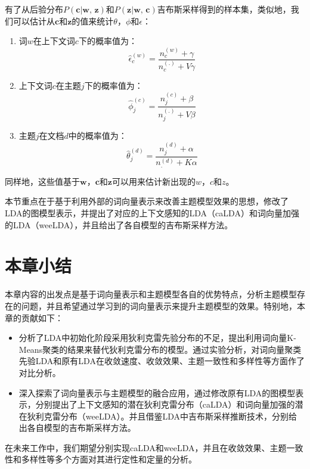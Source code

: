 \documentclass[master]{njuthesis}
\begin{document}
有了从后验分布$P(\textbf{c}|\textbf{w, z})$和$P(\textbf{z}|\textbf{w, c})$吉布斯采样得到的样本集，类似地，我们可以估计从$\textbf{c}$和$\textbf{z}$的值来统计$\theta$，$\phi$和$\epsilon$：
	\begin{enumerate}
	\item 词$w$在上下文词$c$下的概率值为：
		\begin{equation}
		\hat{\epsilon}_{c}^{(w)}=\frac{n_c^{(w)}+\gamma}{n_c^{(.)}+V\gamma}
		\end{equation}
	\item 上下文词$c$在主题$j$下的概率值为：
		\begin{equation}
		\hat{\phi}_{j}^{(c)}=\frac{n_j^{(c)}+\beta}{n_j^{(.)}+V\beta}
		\end{equation}
	\item 主题$j$在文档$d$中的概率值为：
		\begin{equation}
		\hat{\theta}_{j}^{(d)}=\frac{n_{j}^{(d)}+\alpha}{n_{.}^{(d)}+K\alpha}
		\end{equation}	
	\end{enumerate}
	同样地，这些值基于$\textbf{w}$，$\textbf{c}$和$\textbf{z}$可以用来估计新出现的$w$，$c$和$z$。
	
本节重点在于基于利用外部的词向量表示来改善主题模型效果的思想，修改了LDA的图模型表示，并提出了对应的上下文感知的LDA（caLDA）和词向量加强的LDA（weeLDA），并且给出了各自模型的吉布斯采样方法。


\section{本章小结}\label{sec_conclusions_chap5}

本章内容的出发点是基于词向量表示和主题模型各自的优势特点，分析主题模型存在的问题，并且希望通过学习到的词向量表示来提升主题模型的效果。特别地，本章的贡献如下：

\begin{itemize}
\item 分析了LDA中初始化阶段采用狄利克雷先验分布的不足，提出利用词向量K-Means聚类的结果来替代狄利克雷分布的模型。通过实验分析，对词向量聚类先验LDA和原有LDA在收敛速度、收敛效果、主题一致性和多样性等方面作了对比分析。
\item 深入探索了词向量表示与主题模型的融合应用，通过修改原有LDA的图模型表示，分别提出了上下文感知的潜在狄利克雷分布（caLDA）和词向量加强的潜在狄利克雷分布（weeLDA）。并且借鉴LDA中吉布斯采样推断技术，分别给出各自模型的吉布斯采样方法。
\end{itemize}

在未来工作中，我们期望分别实现caLDA和weeLDA，并且在收敛效果、主题一致性和多样性等多个方面对其进行定性和定量的分析。
\end{document}
